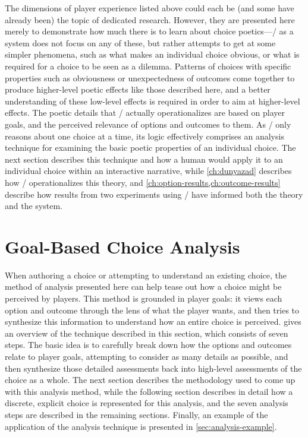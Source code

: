 The dimensions of player experience listed above could each be (and some have already been) the topic of dedicated research.
%
However, they are presented here merely to demonstrate how much there is to learn about choice poetics---\dunyazad/ as a system does not focus on any of these, but rather attempts to get at some simpler phenomena, such as what makes an individual choice obvious, or what is required for a choice to be seen as a dilemma.
%
Patterns of choices with specific properties such as obviousness or unexpectedness of outcomes come together to produce higher-level poetic effects like those described here, and a better understanding of these low-level effects is required in order to aim at higher-level effects.
%
The poetic details that \dunyazad/ actually operationalizes are based on player goals, and the perceived relevance of options and outcomes to them.
%
As \dunyazad/ only reasons about one choice at a time, its logic effectively comprises an analysis technique for examining the basic poetic properties of an individual choice.
%
The next section describes this technique and how a human would apply it to an individual choice within an interactive narrative, while \cref{ch:dunyazad} describes how \dunyazad/ operationalizes this theory, and \cref{ch:option-results,ch:outcome-results} describe how results from two experiments using \dunyazad/ have informed both the theory and the system.

\section{Goal-Based Choice Analysis}

\label{sec:goal-based-choice-analysis}

When authoring a choice or attempting to understand an existing choice, the method of analysis presented here can help tease out how a choice might be perceived by players.
%
This method is grounded in player goals: it views each option and outcome through the lens of what the player wants, and then tries to synthesize this information to understand how an entire choice is perceived.
%
 gives an overview of the technique described in this section, which consists of seven steps.
%
The basic idea is to carefully break down how the options and outcomes relate to player goals, attempting to consider as many details as possible, and then synthesize those detailed assessments back into high-level assessments of the choice as a whole.
%
The next section describes the methodology used to come up with this analysis method, while the following section describes in detail how a discrete, explicit choice is represented for this analysis, and the seven analysis steps are described in the remaining sections.
%
Finally, an example of the application of the analysis technique is presented in \cref{sec:analysis-example}.


